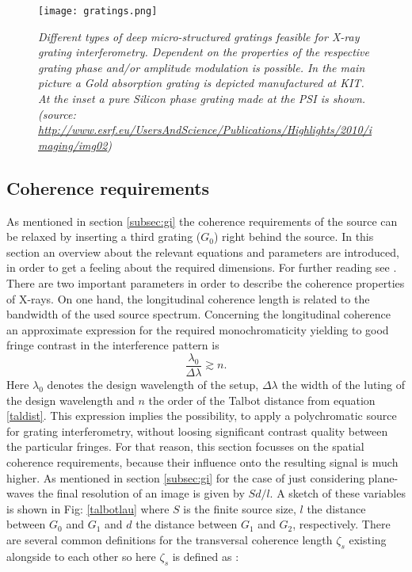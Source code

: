 \begin{figure}[t]
	\begin{center}
		\texttt{[image: gratings.png]}
	\end{center}
	\caption[Different types of deep micro-structured gratings feasible for X-ray interferometry]{\textit{Different types of deep micro-structured gratings feasible for X-ray grating interferometry. Dependent on the properties of the respective grating phase and/or amplitude modulation is possible. In the main picture a Gold absorption grating is depicted manufactured at KIT. At the inset a pure Silicon phase grating made at the PSI is shown.\tiny{(source: \url{http://www.esrf.eu/UsersAndScience/Publications/Highlights/2010/imaging/img02})}}}
	\label{gratings}
\end{figure}  
\subsection{Coherence requirements}\label{subsec: coherence}
As mentioned in section \ref{subsec:gi} the coherence requirements of the source can be relaxed by inserting a third grating ($G_{0}$) right behind the source. In this section an overview about the relevant equations and parameters are introduced, in order to get a feeling about the required dimensions. For further reading see \citep{WeitkampPfeiffer2006,Momose2005}. There are two important parameters in order to describe the coherence properties of X-rays. On one hand, the longitudinal coherence length is related to the bandwidth of the used source spectrum. 
Concerning the longitudinal coherence an approximate expression for the required monochromaticity yielding to good fringe contrast in the interference pattern is\citep{Weitkamp2005} 
\begin{equation}
\frac{\lambda_{0}}{\Delta\lambda} \apprge n. 
\end{equation}
Here $\lambda_{0}$ denotes the design wavelength of the setup, $\Delta\lambda$ the width of the luting of the design wavelength and $n$ the order of the Talbot distance from equation \ref{taldist}. This expression implies the possibility, to apply a polychromatic source for grating interferometry, without loosing significant contrast quality between the particular fringes. For that reason, this section focusses on the spatial coherence requirements, because their influence onto the resulting signal is much higher. As mentioned in section \ref{subsec:gi} for the case of just considering plane-waves the final resolution of an image is given by $S d/l$. A sketch of these variables is shown in Fig: \ref{talbotlau} where $S$ is the finite source size, $l$ the distance between $G_{0}$ and $G_{1}$ and $d$ the distance between $G_{1}$ and $G_{2}$, respectively. There are several common definitions for the transversal coherence length $\zeta_{s}$ existing alongside to each other so here $\zeta_{s}$ is defined as \citep{Weitkamp2005}:
